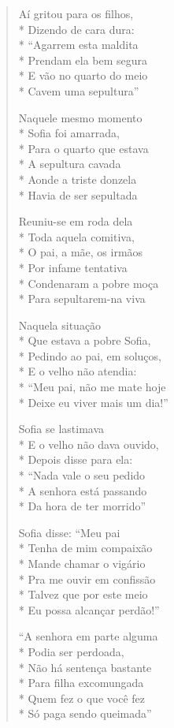 \begin{verse}
Aí gritou para os filhos,\\*
Dizendo de cara dura:\\*
``Agarrem esta maldita\\*
Prendam ela bem segura\\*
E vão no quarto do meio\\*
Cavem uma sepultura''

Naquele mesmo momento\\*
Sofia foi amarrada,\\*
Para o quarto que estava\\*
A sepultura cavada\\*
Aonde a triste donzela\\*
Havia de ser sepultada

Reuniu-se em roda dela\\*
Toda aquela comitiva,\\*
O pai, a mãe, os irmãos\\*
Por infame tentativa\\*
Condenaram a pobre moça\\*
Para sepultarem-na viva

Naquela situação\\*
Que estava a pobre Sofia,\\*
Pedindo ao pai, em soluços,\\*
E o velho não atendia:\\*
``Meu pai, não me mate hoje\\*
Deixe eu viver mais um dia!''

Sofia se lastimava\\*
E o velho não dava ouvido,\\*
Depois disse para ela:\\*
``Nada vale o seu pedido\\*
A senhora está passando\\*
Da hora de ter morrido''

Sofia disse: ``Meu pai\\*
Tenha de mim compaixão\\*
Mande chamar o vigário\\*
Pra me ouvir em confissão\\*
Talvez que por este meio\\*
Eu possa alcançar perdão!''

``A senhora em parte alguma\\*
Podia ser perdoada,\\*
Não há sentença bastante\\*
Para filha excomungada\\*
Quem fez o que você fez\\*
Só paga sendo queimada''


\end{verse}
